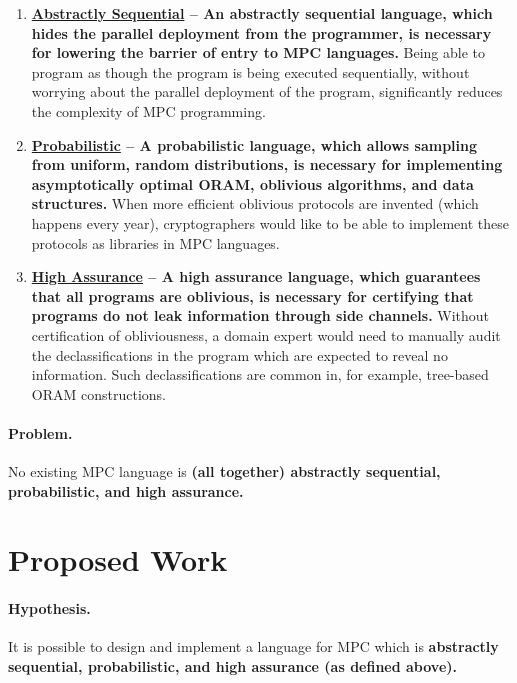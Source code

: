 \documentclass{report}
\begin{document}
\begin{enumerate}
\item \label{itm:sequential} \textbf{\underline{Abstractly Sequential} -- An abstractly sequential language, which hides the parallel deployment from the
  programmer, is necessary for lowering the barrier of entry to MPC languages.}
  Being able to program as though the program is being executed sequentially, without worrying about the parallel deployment
  of the program, significantly reduces the complexity of MPC programming.
\item \label{itm:probabilistic} \textbf{\underline{Probabilistic} -- A probabilistic language, which allows sampling from uniform, random distributions, is necessary
  for implementing asymptotically optimal ORAM, oblivious algorithms, and data structures.}
  When more efficient oblivious protocols are invented (which happens every year), cryptographers would like to be able to
  implement these protocols as libraries in MPC languages.
\item \label{itm:assurance} \textbf{\underline{High Assurance} -- A high assurance language, which guarantees that all programs are oblivious, is necessary
  for certifying that programs do not leak information through side channels.} Without certification of obliviousness, a domain expert
  would need to manually audit the declassifications in the program which are expected to reveal no information. Such declassifications
  are common in, for example, tree-based ORAM constructions.
\end{enumerate}

\paragraph{Problem.} No existing MPC language is \textbf{(all together) abstractly sequential, probabilistic, and high assurance.}

\section{Proposed Work}
\label{sec:intro-proposal}

\paragraph{Hypothesis.} It is possible to design and implement a language for MPC which is \textbf{abstractly sequential, probabilistic,
  and high assurance (as defined above).}
\end{document}
